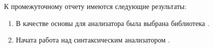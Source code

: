 
К промежуточному отчету имеются следующие результаты:

\begin{enumerate}
    \item В качестве основы для анализатора была выбрана библиотека \angstrom.
    \item Начата работа над синтаксическим анализатором \rescript.
\end{enumerate}
